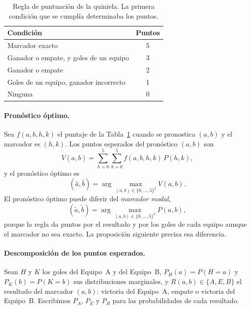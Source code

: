\documentclass[12pt]{article}
\theoremstyle{plain}
\theoremstyle{remark}
\begin{document}
\begin{table}[tb]
\centering
\caption{Regla de puntuación de la quiniela. La primera condición que
se cumplía determinaba los puntos.}
\label{tab:reglas}
\begin{tabular}{lc}
  \toprule
  Condición & Puntos \\
  \midrule
  Marcador exacto & 5 \\
  Ganador o empate, y goles de un equipo & 3 \\
  Ganador o empate & 2 \\
  Goles de un equipo, ganador incorrecto & 1 \\
  Ninguna & 0 \\
  \bottomrule
\end{tabular}
\end{table}

\paragraph{Pronóstico óptimo.}
Sea $f(a, b, h, k)$ el puntaje de la Tabla~\ref{tab:reglas} cuando se
pronostica $(a, b)$ y el marcador
es $(h, k)$.
Los puntos esperados del pronóstico $(a, b)$ son
\begin{equation}
  V(a, b) = \sum_{h=0}^{5} \sum_{k=0}^{5} f(a, b, h, k) \, P(h, k),
\end{equation}
y el pronóstico óptimo es
\begin{equation}
  (\hat{a}, \hat{b}) = \arg\max_{(a,b) \in \{0,\ldots,5\}^2} V(a, b).
\end{equation}
El pronóstico óptimo puede diferir del \emph{marcador modal},
\begin{equation}
  (\tilde{a}, \tilde{b}) = \arg\max_{(a,b) \in \{0,\ldots,5\}^2} P(a, b),
  \label{eq:modal}
\end{equation}
porque la regla da puntos por el resultado y por los goles de cada
equipo aunque el marcador no sea exacto.
La proposición siguiente precisa esa diferencia.

\paragraph{Descomposición de los puntos esperados.}
Sean $H$ y $K$ los goles del Equipo~A y del Equipo~B,
$P_H(a) = P(H = a)$ y $P_K(b) = P(K = b)$ sus distribuciones
marginales, y $R(a, b) \in \{A, E, B\}$ el resultado del marcador
$(a, b)$: victoria del Equipo~A, empate o victoria del Equipo~B.
Escribimos $P_A$, $P_E$ y $P_B$ para las probabilidades de cada
resultado.
\end{document}
